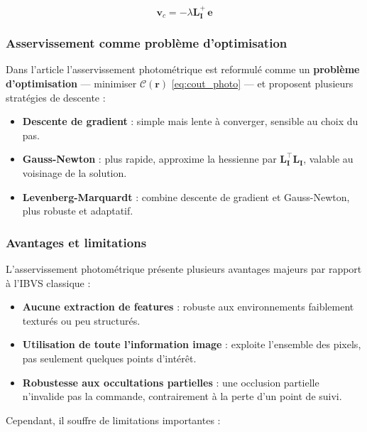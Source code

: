 \begin{equation}
    \mathbf{v}_c = -\lambda \mathbf{L_I^+} \, \mathbf{e}
    \label{eq:commande_photo}
\end{equation}

\subsubsection{Asservissement comme problème d'optimisation}

Dans l'article  \cite{ref7} l'asservissement photométrique est reformulé
comme un \textbf{problème d'optimisation} — minimiser 
$\mathcal{C}(\mathbf{r})$ \eqref{eq:cout_photo} — et proposent plusieurs stratégies de descente :

\begin{itemize}[noitemsep, topsep=4pt]
    \item \textbf{Descente de gradient} : simple mais lente à converger, sensible au choix du pas.
    \item \textbf{Gauss-Newton} : plus rapide, approxime la hessienne 
    par $\mathbf{L_I^\top L_I}$, valable au voisinage de la solution.
    \item \textbf{Levenberg-Marquardt} : combine descente de gradient et Gauss-Newton, plus robuste et adaptatif.
\end{itemize}

\subsubsection{Avantages et limitations}

L'asservissement photométrique présente plusieurs avantages majeurs par 
rapport à l'IBVS classique \cite{ref7} :

\begin{itemize}[noitemsep, topsep=4pt]
    \item \textbf{Aucune extraction de features} : robuste aux environnements 
    faiblement texturés ou peu structurés.
    \item \textbf{Utilisation de toute l'information image} : exploite 
    l'ensemble des pixels, pas seulement quelques points d'intérêt.
    \item \textbf{Robustesse aux occultations partielles} : une occlusion 
    partielle n'invalide pas la commande, contrairement à la perte d'un 
    point de suivi.
\end{itemize}

Cependant, il souffre de limitations importantes :


